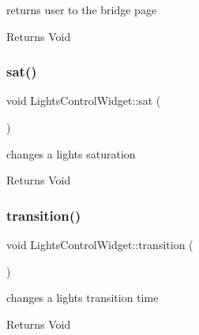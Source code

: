 returns user to the bridge page 

\begin{DoxyReturn}{Returns}
Void 
\end{DoxyReturn}
\mbox{\label{class_lights_control_widget_a154f0a2b37fbbd67c920b392086ec60c}} 
\subsubsection{\texorpdfstring{sat()}{sat()}}
{\footnotesize\ttfamily void Lights\+Control\+Widget\+::sat (\begin{DoxyParamCaption}{ }\end{DoxyParamCaption})\hspace{0.3cm}{\ttfamily [private]}}



changes a light\textquotesingle{}s saturation 

\begin{DoxyReturn}{Returns}
Void 
\end{DoxyReturn}
\mbox{\label{class_lights_control_widget_a10fad17f0722f34402a906c77c1711bb}} 
\subsubsection{\texorpdfstring{transition()}{transition()}}
{\footnotesize\ttfamily void Lights\+Control\+Widget\+::transition (\begin{DoxyParamCaption}{ }\end{DoxyParamCaption})\hspace{0.3cm}{\ttfamily [private]}}



changes a light\textquotesingle{}s transition time 

\begin{DoxyReturn}{Returns}
Void 
\end{DoxyReturn}
\mbox{\label{class_lights_control_widget_a595489c5a7076eeaf32fee9d48bbd1fe}} 

